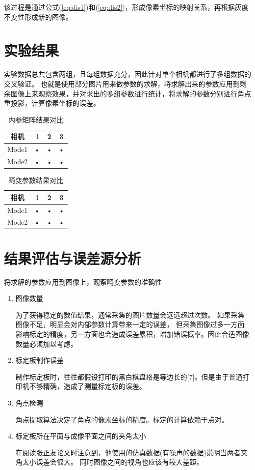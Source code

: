\documentclass[10pt,a4paper]{article}
\begin{document}
\begin{CJK*}{UTF8}{gbsn}
该过程是通过公式(\ref{eq:dis1})和(\ref{eq:dis2})，形成像素坐标的映射关系，再根据灰度不变性形成新的图像。


\section{实验结果}
实验数据总共包含两组，且每组数据充分，因此针对单个相机都进行了多组数据的交叉验证。
也就是使用部分图片用来做参数的求解，将求解出来的参数应用到剩余图像上来观察效果，并对求出的多组参数进行统计，将求解的参数分别进行角点重投影，计算像素坐标的误差。

\begin{table}[htbp]
\centering
\caption{内参矩阵结果对比}
	\begin{tabular}{|c|c|c|c|}
	\hline 
	相机 & 1 & 2 & 3 \\ 
	\hline 
	Mode1 & • & • & • \\ 
	\hline 
	Mode2 & • & • & • \\ 
	\hline 
	\end{tabular} 
\end{table}

\begin{table}[htbp]
    \centering
    \caption{畸变参数结果对比}
        \begin{tabular}{|c|c|c|c|}
        \hline 
        相机 & 1 & 2 & 3 \\ 
        \hline 
        Mode1 & • & • & • \\ 
        \hline 
        Mode2 & • & • & • \\ 
        \hline 
        \end{tabular} 
    \end{table}

\section{结果评估与误差源分析}
将求解的参数应用到图像上，观察畸变参数的准确性

\begin{enumerate}[(1)]
    \item 图像数量
    
    为了获得稳定的数值结果，通常采集的图片数量会远远超过次数。
    如果采集图像不足，明显会对内部参数计算带来一定的误差，
    但采集图像过多一方面影响标定的精度，另一方面也会造成误差累积，增加错误概率。因此合适图像数量必须加以考虑。
    \item 标定板制作误差
    
    制作标定板时，往往都假设打印的黑白棋盘格是等边长的[7]。但是由于普通打印机不够精确，造成了测量标定板的误差。
    \item 角点检测
    
    角点提取算法决定了角点的像素坐标的精度。标定的计算依赖于点对。
    \item 标定板所在平面与成像平面之间的夹角太小
    
    在阅读张正友论文时注意到，他使用的仿真数据(有噪声的数据)说明当两者夹角太小误差会很大。
    同时图像之间的视角也应该有较大差距。
\end{enumerate}
\end{CJK*}
\end{document}
